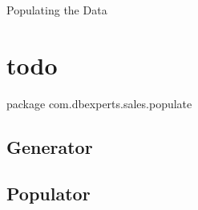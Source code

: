 Populating the Data

\section{todo}

package com.dbexperts.sales.populate 

\subsection{Generator}
\subsection{Populator}
